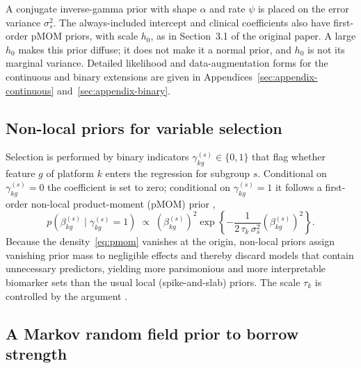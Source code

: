 \documentclass[article]{jss}
\begin{document}
%
A conjugate inverse-gamma prior with shape $\alpha$ and rate $\psi$ is placed on
the error variance $\sigma_s^2$. The always-included intercept and clinical
coefficients also have first-order pMOM priors, with scale $h_0$, as in
Section~3.1 of the original paper. A large $h_0$ makes this prior diffuse;
it does not make it a normal prior, and $h_0$ is not its marginal variance. Detailed likelihood and
data-augmentation forms for the continuous and binary extensions are given in
Appendices~\ref{sec:appendix-continuous} and~\ref{sec:appendix-binary}.

\subsection{Non-local priors for variable selection}\label{sec:nlp}

Selection is performed by binary indicators $\gamma^{(s)}_{kg}\in\{0,1\}$ that
flag whether feature $g$ of platform $k$ enters the regression for subgroup $s$.
Conditional on $\gamma^{(s)}_{kg}=0$ the coefficient is set to zero; conditional
on $\gamma^{(s)}_{kg}=1$ it follows a first-order non-local product-moment
(pMOM) prior \citep{johnson2012},
%
\begin{equation}\label{eq:pmom}
  p\!\left(\beta^{(s)}_{kg}\mid\gamma^{(s)}_{kg}=1\right)\;\propto\;
  \left(\beta^{(s)}_{kg}\right)^{2}
  \exp\!\left\{-\frac{1}{2\,\tau_k\,\sigma^2_s}\left(\beta^{(s)}_{kg}\right)^{2}\right\}.
\end{equation}
%
Because the density~\eqref{eq:pmom} vanishes at the origin, non-local priors
assign vanishing prior mass to negligible effects and thereby discard models
that contain unnecessary predictors, yielding more parsimonious and more
interpretable biomarker sets than the usual local (spike-and-slab) priors. The
scale $\tau_k$ is controlled by the argument .

\subsection{A Markov random field prior to borrow strength}\label{sec:mrf}
\end{document}
